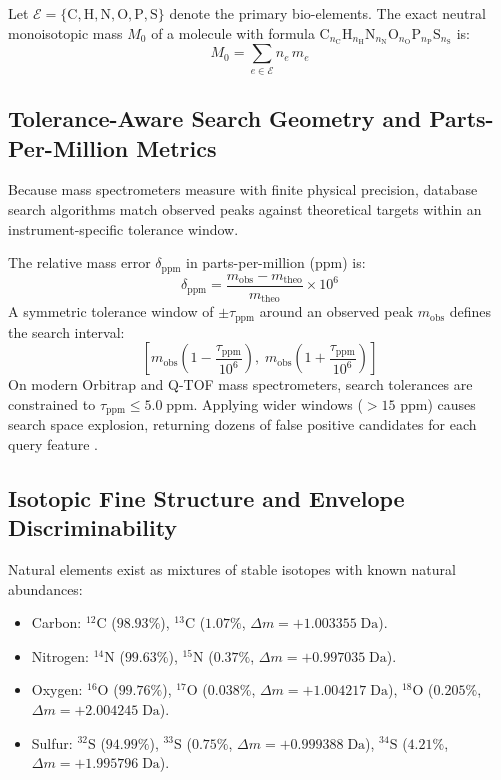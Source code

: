 \documentclass[11pt,twoside,openright]{book}
\begin{document}
Let $\mathcal{E} = \{\text{C}, \text{H}, \text{N}, \text{O}, \text{P}, \text{S}\}$ denote the primary bio-elements. The exact neutral monoisotopic mass $M_0$ of a molecule with formula $\text{C}_{n_{\text{C}}}\text{H}_{n_{\text{H}}}\text{N}_{n_{\text{N}}}\text{O}_{n_{\text{O}}}\text{P}_{n_{\text{P}}}\text{S}_{n_{\text{S}}}$ is:
\begin{equation}
M_0 = \sum_{e \in \mathcal{E}} n_e \, m_e
\label{eq:neutral_mass_exact}
\end{equation}

\subsection{Tolerance-Aware Search Geometry and Parts-Per-Million Metrics}

Because mass spectrometers measure with finite physical precision, database search algorithms match observed peaks against theoretical targets within an instrument-specific tolerance window.

The relative mass error $\delta_{\text{ppm}}$ in parts-per-million (ppm) is:
\begin{equation}
\delta_{\text{ppm}} = \frac{m_{\text{obs}} - m_{\text{theo}}}{m_{\text{theo}}} \times 10^6
\label{eq:ppm_error}
\end{equation}
A symmetric tolerance window of $\pm \tau_{\text{ppm}}$ around an observed peak $m_{\text{obs}}$ defines the search interval:
\begin{equation}
\left[ m_{\text{obs}} \left(1 - \frac{\tau_{\text{ppm}}}{10^6}\right), \; m_{\text{obs}} \left(1 + \frac{\tau_{\text{ppm}}}{10^6}\right) \right]
\label{eq:search_interval}
\end{equation}
On modern Orbitrap and Q-TOF mass spectrometers, search tolerances are constrained to $\tau_{\text{ppm}} \le 5.0\;\text{ppm}$. Applying wider windows ($>15$ ppm) causes search space explosion, returning dozens of false positive candidates for each query feature \cite{kind2007seven}.

\subsection{Isotopic Fine Structure and Envelope Discriminability}

Natural elements exist as mixtures of stable isotopes with known natural abundances:
\begin{itemize}
    \item Carbon: $^{12}\text{C}$ ($98.93\%$), $^{13}\text{C}$ ($1.07\%$, $\Delta m = +1.003355\;\text{Da}$).
    \item Nitrogen: $^{14}\text{N}$ ($99.63\%$), $^{15}\text{N}$ ($0.37\%$, $\Delta m = +0.997035\;\text{Da}$).
    \item Oxygen: $^{16}\text{O}$ ($99.76\%$), $^{17}\text{O}$ ($0.038\%$, $\Delta m = +1.004217\;\text{Da}$), $^{18}\text{O}$ ($0.205\%$, $\Delta m = +2.004245\;\text{Da}$).
    \item Sulfur: $^{32}\text{S}$ ($94.99\%$), $^{33}\text{S}$ ($0.75\%$, $\Delta m = +0.999388\;\text{Da}$), $^{34}\text{S}$ ($4.21\%$, $\Delta m = +1.995796\;\text{Da}$).
\end{itemize}
\end{document}
